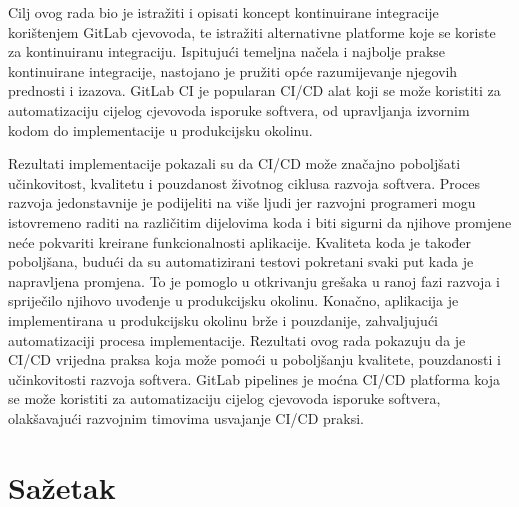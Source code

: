 \documentclass[a4paper,12pt,oneside]{article}
\begin{document}
Cilj ovog rada bio je istražiti i opisati koncept kontinuirane integracije korištenjem GitLab cjevovoda, te istražiti alternativne platforme koje se koriste za kontinuiranu integraciju. Ispitujući temeljna načela i najbolje prakse kontinuirane integracije, nastojano je pružiti opće razumijevanje njegovih prednosti i izazova. GitLab CI je popularan CI/CD alat koji se može koristiti za automatizaciju cijelog cjevovoda isporuke softvera, od upravljanja izvornim kodom do implementacije u produkcijsku okolinu.

Rezultati implementacije pokazali su da CI/CD može značajno poboljšati učinkovitost, kvalitetu i pouzdanost životnog ciklusa razvoja softvera. Proces razvoja jedonstavnije je podijeliti na više ljudi jer razvojni programeri mogu istovremeno raditi na različitim dijelovima koda i biti sigurni da njihove promjene neće pokvariti kreirane funkcionalnosti aplikacije. Kvaliteta koda je također poboljšana, budući da su automatizirani testovi pokretani svaki put kada je napravljena promjena. To je pomoglo u otkrivanju grešaka u ranoj fazi razvoja i spriječilo njihovo uvođenje u produkcijsku okolinu. Konačno, aplikacija je implementirana u produkcijsku okolinu brže i pouzdanije, zahvaljujući automatizaciji procesa implementacije.
Rezultati ovog rada pokazuju da je CI/CD vrijedna praksa koja može pomoći u poboljšanju kvalitete, pouzdanosti i učinkovitosti razvoja softvera. GitLab pipelines je moćna CI/CD platforma koja se može koristiti za automatizaciju cijelog cjevovoda isporuke softvera, olakšavajući razvojnim timovima usvajanje CI/CD praksi.

\newpage
\section*{Sa\v{z}etak}
\end{document}
